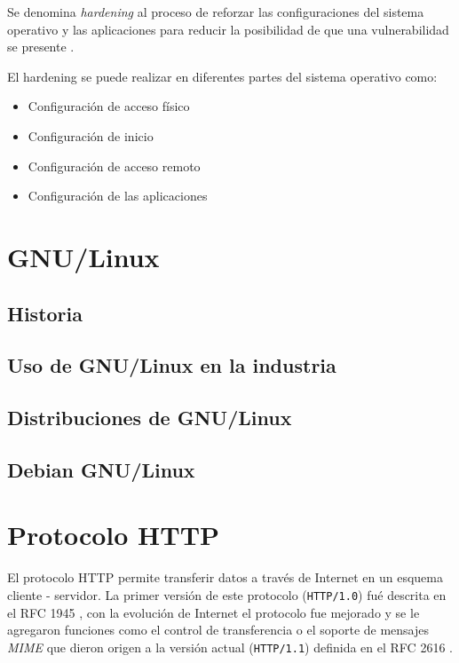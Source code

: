 Se denomina \textit{hardening} al proceso de reforzar las configuraciones del sistema operativo y las aplicaciones para reducir la posibilidad de que una vulnerabilidad se presente \cite{padilla_buenas_2009}.

El hardening se puede realizar en diferentes partes del sistema operativo como:

\begin{itemize}
  \item Configuraci\'{o}n de acceso f\'{i}sico
  \item Configuraci\'{o}n de inicio
  \item Configuraci\'{o}n de acceso remoto
  \item Configuraci\'{o}n de las aplicaciones
\end{itemize}

\section {GNU/Linux}
  \subsection {Historia}
  \subsection {Uso de GNU/Linux en la industria}
  \subsection {Distribuciones de GNU/Linux}
  \subsection {Debian GNU/Linux}

\section {Protocolo HTTP}

El protocolo HTTP permite transferir datos a trav\'{e}s de Internet en un esquema cliente - servidor. La primer versi\'{o}n de este protocolo (\verb|HTTP/1.0|) fu\'{e} descrita en el RFC 1945 \cite{rfc1945}, con la evoluci\'{o}n de Internet el protocolo fue mejorado y se le agregaron funciones como el control de transferencia o el soporte de mensajes \textit{MIME} que dieron origen a la versi\'{o}n actual (\verb|HTTP/1.1|) definida en el RFC 2616 \cite{rfc2616}.

